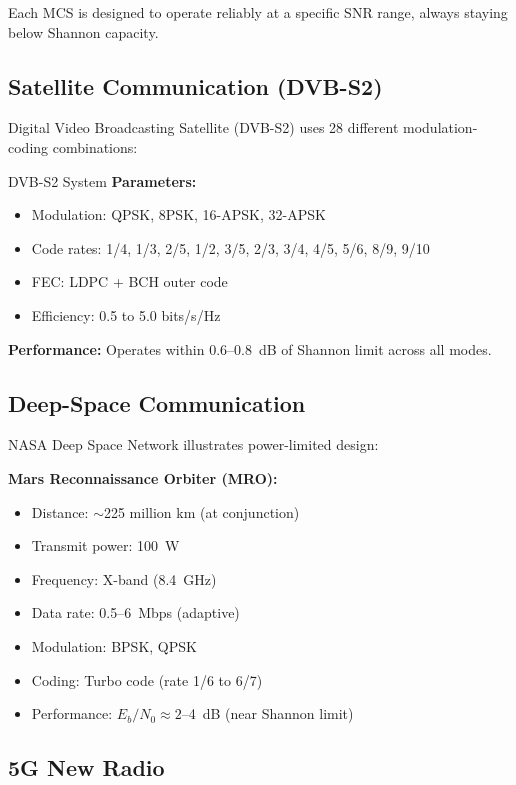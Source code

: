Each MCS is designed to operate reliably at a specific SNR range, always staying below Shannon capacity.

\subsection{Satellite Communication (DVB-S2)}

Digital Video Broadcasting Satellite (DVB-S2) uses 28 different modulation-coding combinations:

\begin{calloutbox}[colback=black!5!white,colframe=black]{DVB-S2 System}
\textbf{Parameters:}
\begin{itemize}
\item Modulation: QPSK, 8PSK, 16-APSK, 32-APSK
\item Code rates: 1/4, 1/3, 2/5, 1/2, 3/5, 2/3, 3/4, 4/5, 5/6, 8/9, 9/10
\item FEC: LDPC + BCH outer code
\item Efficiency: 0.5 to 5.0 bits/s/Hz
\end{itemize}

\textbf{Performance:} Operates within 0.6--0.8~dB of Shannon limit across all modes.
\end{calloutbox}

\subsection{Deep-Space Communication}

NASA Deep Space Network illustrates power-limited design:

\textbf{Mars Reconnaissance Orbiter (MRO):}
\begin{itemize}
\item Distance: $\sim$225 million km (at conjunction)
\item Transmit power: 100~W
\item Frequency: X-band (8.4~GHz)
\item Data rate: 0.5--6~Mbps (adaptive)
\item Modulation: BPSK, QPSK
\item Coding: Turbo code (rate 1/6 to 6/7)
\item Performance: $E_b/N_0 \approx 2$--4~dB (near Shannon limit)
\end{itemize}

\subsection{5G New Radio}

